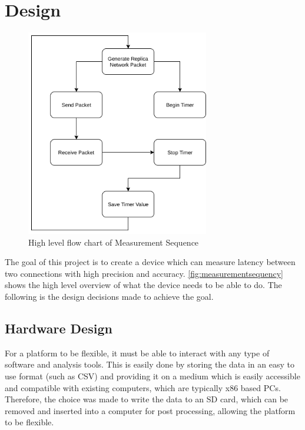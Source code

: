 \chapter{Design}\label{C:design}

\begin{figure}[H]
    \begin{center}
        \includegraphics[keepaspectratio,width=8cm]{Images/MeasurementSequence}
        \caption{High level flow chart of Measurement Sequence}
        \label{fig:measurementsequence}
    \end{center}
\end{figure}

The goal of this project is to create a device which can measure latency between two connections with high precision
and accuracy. \ref{fig:measurementsequency} shows the high level overview of what the device needs to be able to do.
The following is the design decisions made to achieve the goal.

\section{Hardware Design}

For a platform to be flexible, it must be able to interact with any type of software and analysis tools. This is 
easily done by storing the data in an easy to use format (such as CSV) and providing it on a medium which is 
easily accessible and compatible with existing computers, which are typically x86 based PCs. Therefore, the choice 
was made to write the data to an SD card, which can be removed and inserted into a computer for post processing, 
allowing the platform to be flexible. 

